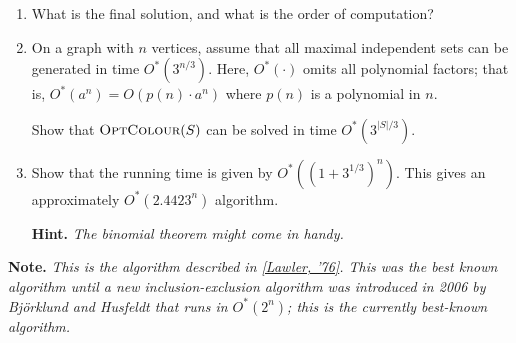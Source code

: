 \documentclass{article}
\begin{document}
\begin{question}
\begin{enumerate}[label = (\alph*)]
\begin{enumerate}[label = (\roman*)]
        \item What is the final solution, and what is the order of computation?

        \item On a graph with $n$ vertices, assume that all maximal independent sets can be generated in time $O^*(3^{n/3})$. Here, $O^*(\cdot)$ omits all polynomial factors; that is, $O^*(a^n) = O(p(n) \cdot a^n)$ where $p(n)$ is a polynomial in $n$.

        Show that $\mathsf{\textsc{OptColour}}(S)$ can be solved in time $O^*\left(3^{\lvert S \rvert /3}\right)$.

        \item Show that the running time is given by $O^*\left((1 + 3^{1/3})^n\right)$. This gives an approximately $O^*(2.4423^n)$ algorithm.

        {\bfseries Hint.} {\em The binomial theorem might come in handy.}
    \end{enumerate}
\end{enumerate}

{\bfseries Note.} {\em This is the algorithm described in \href{https://www.semanticscholar.org/paper/A-Note-on-the-Complexity-of-the-Chromatic-Number-Lawler/0742e3eac4efae7db8c0ac816223e2e4c51a93f6}{[Lawler, '76]}. This was the best known algorithm until a new inclusion-exclusion algorithm was introduced in 2006 by Bj\"orklund and Husfeldt that runs in $O^*(2^n)$; this is the currently best-known algorithm.}
\end{question}
\end{document}

